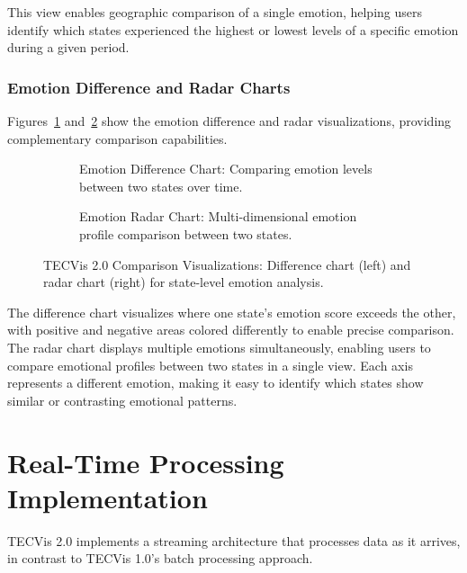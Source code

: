This view enables geographic comparison of a single emotion, helping users identify which states experienced the highest or lowest levels of a specific emotion during a given period.

\subsubsection{Emotion Difference and Radar Charts}

Figures~\ref{fig:tab3_difference} and~\ref{fig:tab4_radar} show the emotion difference and radar visualizations, providing complementary comparison capabilities.

\begin{figure}[htbp]
\centering
\begin{subfigure}[b]{0.48\textwidth}
\centering

\caption{Emotion Difference Chart: Comparing emotion levels between two states over time.}
\label{fig:tab3_difference}
\end{subfigure}
\hfill
\begin{subfigure}[b]{0.48\textwidth}
\centering

\caption{Emotion Radar Chart: Multi-dimensional emotion profile comparison between two states.}
\label{fig:tab4_radar}
\end{subfigure}
\caption{TECVis 2.0 Comparison Visualizations: Difference chart (left) and radar chart (right) for state-level emotion analysis.}
\label{fig:comparison_charts}
\end{figure}

The difference chart visualizes where one state's emotion score exceeds the other, with positive and negative areas colored differently to enable precise comparison. The radar chart displays multiple emotions simultaneously, enabling users to compare emotional profiles between two states in a single view. Each axis represents a different emotion, making it easy to identify which states show similar or contrasting emotional patterns.
    

\section{Real-Time Processing Implementation}

TECVis 2.0 implements a streaming architecture that processes data as it arrives, in contrast to TECVis 1.0's batch processing approach.

